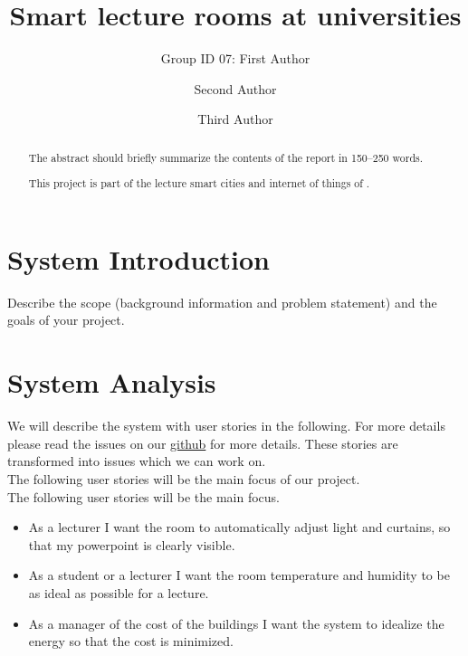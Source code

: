 \documentclass[runningheads]{llncs}
\begin{document}
%
\title{Smart lecture rooms at universities}

\author{Group ID 07: First Author \and
Second Author \and
Third Author}

%
\maketitle              %
%
\begin{abstract}
The abstract should briefly summarize the contents of the report in
150--250 words.

This project is part of the lecture smart cities and internet of things of \cite{ref_url1}. 

\end{abstract}
%
%
%
\section{System Introduction}
Describe the scope (background information and problem statement) and the goals of your project.

\section{System Analysis}
We will describe the system with user stories in the following. For more details please read the issues on our \href{https://github.com/Jinaz/scaiot-project/issues}{github} for more details. These stories are transformed into issues which we can work on.\\

The following user stories will be the main focus of our project.\\

The following user stories will be the main focus.\\
\begin{itemize}
\item As a lecturer I want the room to automatically adjust light and curtains, so that my powerpoint is clearly visible.\\

\item As a student or a lecturer I want the room temperature and humidity to be as ideal as possible for a lecture.\\

\item As a manager of the cost of the buildings I want the system to idealize the energy so that the cost is minimized.\\
\end{itemize}
\end{document}

